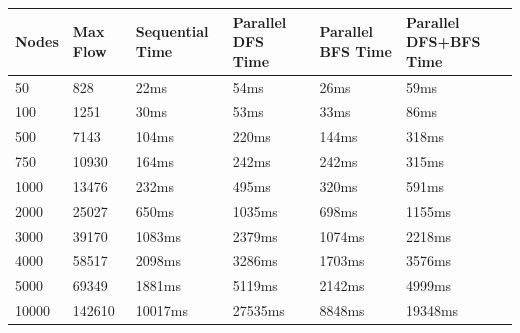     \begin{tabular}{ | m{2.3em} | m{2.5em }| m{3.8em} | m{3.2em} | m{3em} | m{3.9em} | } 
      \hline
      Nodes & Max Flow & Sequential Time & Parallel DFS Time & Parallel BFS Time & Parallel DFS+BFS Time\\
      
        \hline
        50      & 828     & 22ms & 54ms & 26ms & 59ms\\
        \hline
        100     & 1251    & 30ms & 53ms & 33ms & 86ms\\  
        \hline
        500     & 7143    & 104ms & 220ms & 144ms & 318ms\\        
        \hline   
        750     & 10930   & 164ms & 242ms & 242ms & 315ms \\         
        \hline
        1000    & 13476   & 232ms & 495ms & 320ms & 591ms \\          
        \hline
        2000    & 25027   & 650ms & 1035ms & 698ms & 1155ms \\      
        \hline
        3000    & 39170   & 1083ms & 2379ms & 1074ms & 2218ms \\            
        \hline
        4000    & 58517   & 2098ms & 3286ms & 1703ms & 3576ms \\      
        \hline
        5000    & 69349   & 1881ms & 5119ms & 2142ms & 4999ms \\      
        \hline
        10000   & 142610  & 10017ms & 27535ms & 8848ms & 19348ms \\      
        \hline
    \end{tabular}